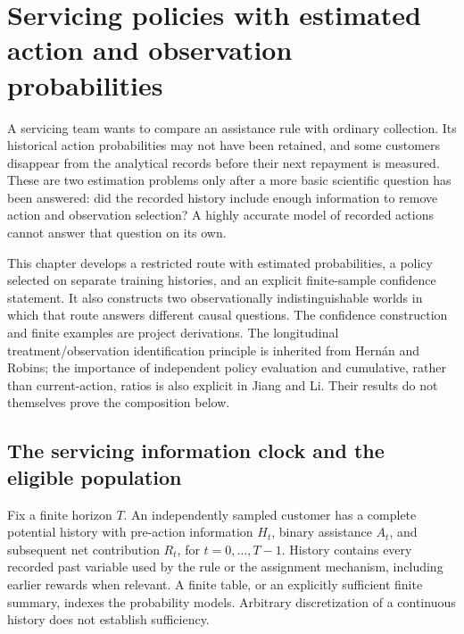 \hypertarget{servicing-policies-with-estimated-action-and-observation-probabilities}{%
\chapter{Servicing policies with estimated action and observation
probabilities}\label{servicing-policies-with-estimated-action-and-observation-probabilities}}

\label{exec13:servicing-observed}

A servicing team wants to compare an assistance rule with ordinary
collection. Its historical action probabilities may not have been
retained, and some customers disappear from the analytical records
before their next repayment is measured. These are two estimation
problems only after a more basic scientific question has been answered:
did the recorded history include enough information to remove action and
observation selection? A highly accurate model of recorded actions
cannot answer that question on its own.

This chapter develops a restricted route with estimated probabilities, a
policy selected on separate training histories, and an explicit
finite-sample confidence statement. It also constructs two
observationally indistinguishable worlds in which that route answers
different causal questions. The confidence construction and finite
examples are project derivations. The longitudinal treatment/observation
identification principle is inherited from Hernán and Robins; the
importance of independent policy evaluation and cumulative, rather than
current-action, ratios is also explicit in Jiang and Li. Their results
do not themselves prove the composition below.
\citep{hernan2020,jiang2016,exec13_servicing_argument,exec13_servicing_exact}

\hypertarget{the-servicing-information-clock-and-the-eligible-population}{%
\section{The servicing information clock and the eligible
population}\label{the-servicing-information-clock-and-the-eligible-population}}

Fix a finite horizon \(T\). An independently sampled customer has a
complete potential history with pre-action information \(H_t\), binary
assistance \(A_t\), and subsequent net contribution \(R_t\), for
\(t=0,\ldots,T-1\). History contains every recorded past variable used
by the rule or the assignment mechanism, including earlier rewards when
relevant. A finite table, or an explicitly sufficient finite summary,
indexes the probability models. Arbitrary discretization of a continuous
history does not establish sufficiency.

